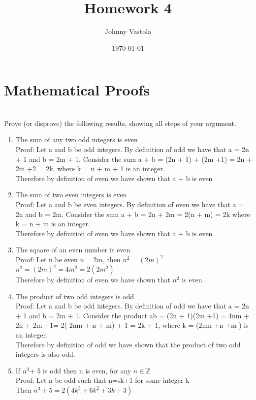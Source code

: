 \documentclass[12pt]{article}
\title{Homework 4}
\author{Johnny Vastola}
\date{\today}
\begin{document}
\maketitle

\section*{Mathematical Proofs}\\

Prove (or disprove) the following results, showing all steps of your argument.
\begin{enumerate}
\item 
The sum of any two odd integers is even\\
Proof:
Let a and b be odd integers. By definition of odd we have that a = 2n + 1 and
b = 2m + 1. Consider the sum a + b = (2n + 1) + (2m +1) = 2n + 2m +2 = 2k, where k = n + m + 1 is an integer.\\
Therefore by definition of even we have shown that a + b is even
\item
The sum of two even integers is even\\
Proof:
Let a and b be even integers. By definition of even we have that a = 2n and b = 2m.
Consider the sum a + b = 2n + 2m = 2(n + m) = 2k where k = n + m is an integer.\\
Therefore by definition of even we have shown that a + b is even 
\item
The square of an even number is even\\
Proof:
Let n be even $n=2m$, then $n^2=(2m)^2$\\
$n^2 = (2m)^2 = 4m^2
=2(2m^2)$\\
Therefore by definition of even we have shown that $n^2$ is even 
\item
The product of two odd integers is odd\\
Proof:
Let a and b be odd integers. By definition of odd we have that a = 2n + 1
and b = 2m + 1. Consider the product ab = (2n + 1)(2m +1) = 4nm + 2n + 2m +1=
2( 2nm + n + m) + 1 = 2k + 1, where k = (2nm +n +m ) is an integer.\\
Therefore by definition of odd we have shown that the product of two odd integers is also odd. 
\item
If $n^3$+ 5 is odd then n is even, for any  $n \in \mathbb{Z}$\\
Proof: Let n be odd such that n=sk+1 for some integer k\\
Then $n^3+5 =2(4k^3 + 6k^2+ 3k + 3)$\\

\end{enumerate}
\end{document}
